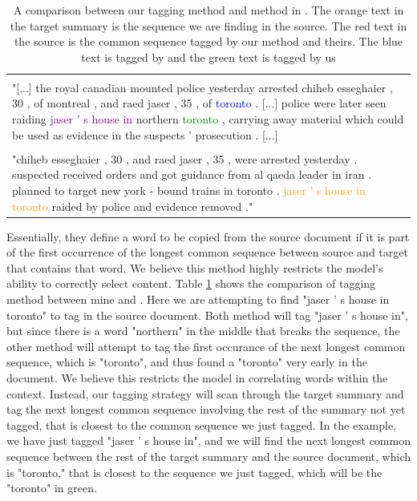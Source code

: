 \documentclass[11pt,a4paper]{article}
\begin{document}
 \begin{table}[t]
	\begin{tabular}{@{}|l|@{}}
		\hline
		\begin{minipage}{.9\linewidth}
			\vspace{.1in}
			\textbf{Source:} \\
			"[...] the royal canadian mounted police yesterday arrested chiheb esseghaier , 30 , of montreal , and raed jaser , 35 , of \textcolor{blue}{toronto} . [...] police were later seen raiding \textcolor{purple}{jaser ' s house in} northern \textcolor{green}{toronto} , carrying away material which could be used as evidence in the suspects ' prosecution . [...]
		\end{minipage}\\ \hline
		
		\begin{minipage}{.9\linewidth}
			\vspace{.1in}
			\textbf{Target:}\\
			"chiheb esseghaier , 30 , and raed jaser , 35 , were arrested yesterday . suspected received orders and got guidance from al qaeda leader in iran . planned to target new york - bound trains in toronto . \textcolor{orange}{jaser ' s house in toronto} raided by police and evidence removed ."
			\vspace{.1in}
		\end{minipage}\\ \hline
	\end{tabular}
	\caption{A comparison between our tagging method and method in \citet{bottom-up}. The orange text in the target summary is the sequence we are finding in the source. The red text in the source is the common sequence tagged by our method and theirs. The blue text is tagged by \citet{bottom-up} and the green text is tagged by us}
	\label{table:tag}
\end{table}

Essentially, they define a word to be copied from the source document if it is part of the first occurrence of the longest common sequence between source and target that contains that word. We believe this method highly restricts the model's ability to correctly select content. Table \ref{table:tag} shows the comparison of tagging method between mine and \citet{bottom-up}. Here we are attempting to find "jaser ' s house in toronto" to tag in the source document. Both method will tag "jaser ' s house in", but since there is a word "northern" in the middle that breaks the sequence, the other method will attempt to tag the first occurance of the next longest common sequence, which is "toronto", and thus found a "toronto" very early in the document. We believe this restricts the model in correlating words within the context. Instead, our tagging strategy will scan through the target summary and tag the next longest common sequence involving the rest of the summary not yet tagged, that is closest to the common sequence we just tagged. In the example, we have just tagged "jaser ' s house in", and we will find the next longest common sequence between the rest of the target summary and the source document, which is "toronto," that is closest to the sequence we just tagged, which will be the "toronto" in green.
\end{document}
